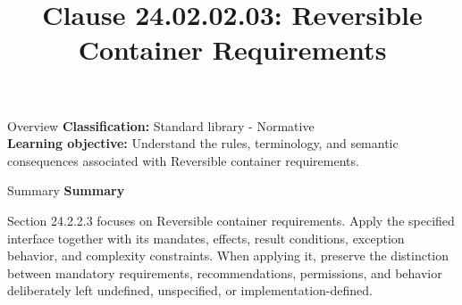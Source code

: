 \documentclass[10pt,letterpaper]{article}
\title{Clause 24.02.02.03: Reversible Container Requirements}
\author{}
\date{}
\begin{document}
\maketitle
\begin{CornellOverviewBox}{Overview}
\textbf{Classification:} Standard library - Normative\\[2pt]
\textbf{Learning objective:} Understand the rules, terminology, and semantic consequences associated with Reversible container requirements.
\end{CornellOverviewBox}\begin{CornellSummaryBox}{Summary}
{\sffamily\bfseries\color{Accent} Summary}\par\vspace{3pt}Section 24.2.2.3 focuses on Reversible container requirements. Apply the specified interface together with its mandates, effects, result conditions, exception behavior, and complexity constraints. When applying it, preserve the distinction between mandatory requirements, recommendations, permissions, and behavior deliberately left undefined, unspecified, or implementation-defined.
\end{CornellSummaryBox}
\end{document}
